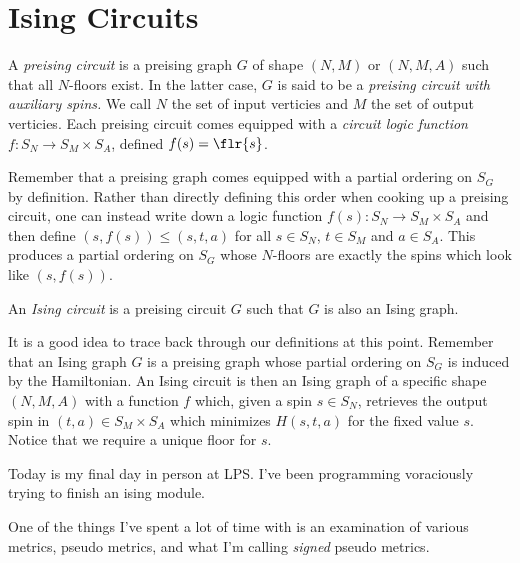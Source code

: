 \newpage

\section{Ising Circuits}
\begin{defn}\label{defn:preising-circuit}
	A \emph{preising circuit} is a preising graph $G$ of shape $(N,M)$ or $(N,M,A)$ such that all $N$-floors exist. In the latter case, $G$ is said to be a \emph{preising circuit with auxiliary spins.} We call $N$ the set of input verticies and $M$ the set of output verticies. Each preising circuit comes equipped with a \emph{circuit logic function} $f:S_N\to S_M\times S_A$, defined $f(s) = \flr{s}$.
\end{defn}
Remember that a preising graph comes equipped with a partial ordering on $S_G$ by definition. Rather than directly defining this order when cooking up a preising circuit, one can instead write down a logic function $f(s):S_N \to S_M\times S_A$ and then define $(s,f(s)) \leq (s,t,a)$ for all $s \in S_N$, $t \in S_M$ and $a \in S_A$. This produces a partial ordering on $S_G$ whose $N$-floors are exactly the spins which look like $(s,f(s))$.

\begin{defn}\label{defn:ising-circuit}
	An \emph{Ising circuit} is a preising circuit $G$ such that $G$ is also an Ising graph.
\end{defn}
\begin{rmk}\label{rmk:ising-circuit-defn}
	It is a good idea to trace back through our definitions at this point. Remember that an Ising graph $G$ is a preising graph whose partial ordering on $S_G$ is induced by the Hamiltonian. An Ising circuit is then an Ising graph of a specific shape $(N,M,A)$ with a function $f$ which, given a spin $s \in S_N$, retrieves the output spin in $(t,a)\in S_M\times S_A$ which minimizes $H(s,t,a)$ for the fixed value $s$. Notice that we require a unique floor for $s$.
\end{rmk}


Today is my final day in person at LPS. I've been programming voraciously trying to finish an ising module.

One of the things I've spent a lot of time with is an examination of various metrics, pseudo metrics, and what I'm calling \emph{signed} pseudo metrics. 


\printbibliography
